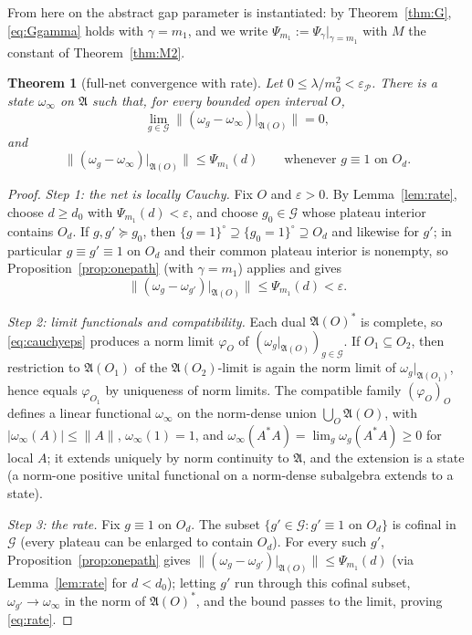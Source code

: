 \documentclass[11pt,a4paper]{article}
\theoremstyle{plain}
\newtheorem{theorem}{Theorem}[section]
\theoremstyle{definition}
\theoremstyle{plain}
\theoremstyle{definition}
\newcommand{\A}{\mathfrak{A}}
\newcommand{\G}{\mathcal{G}}
\begin{document}
From here on the abstract gap parameter is instantiated: by Theorem~\ref{thm:G},
\eqref{eq:Ggamma} holds with $\gamma=m_1$, and we write
$\Psi_{m_1}:=\Psi_\gamma|_{\gamma=m_1}$ with $M$ the constant of Theorem~\ref{thm:M2}.

\begin{theorem}[full-net convergence with rate]\label{thm:cauchy}
Let $0\le\lambda/m_0^2<\varepsilon_{\mathscr P}$. There is a state $\omega_\infty$ on $\A$
such that, for every bounded open interval $O$,
\[
 \lim_{g\in\G}\bigl\|(\omega_g-\omega_\infty)|_{\A(O)}\bigr\|=0 ,
\]
and
\begin{equation}
 \|(\omega_g-\omega_\infty)|_{\A(O)}\|\le\Psi_{m_1}(d)
 \qquad\text{whenever }g\equiv1\text{ on }O_d .
 \label{eq:rate}
\end{equation}
\end{theorem}

\begin{proof}
\emph{Step 1: the net is locally Cauchy.} Fix $O$ and $\varepsilon>0$. By
Lemma~\ref{lem:rate}, choose $d\ge d_0$ with $\Psi_{m_1}(d)<\varepsilon$, and choose
$g_0\in\G$ whose plateau interior contains $O_d$. If $g,g'\succcurlyeq g_0$, then
$\{g=1\}^\circ\supseteq\{g_0=1\}^\circ\supseteq O_d$ and likewise for $g'$; in particular
$g\equiv g'\equiv1$ on $O_d$ and their common plateau interior is nonempty, so
Proposition~\ref{prop:onepath} (with $\gamma=m_1$) applies and gives
\begin{equation}
 \|(\omega_g-\omega_{g'})|_{\A(O)}\|\le\Psi_{m_1}(d)<\varepsilon .
 \label{eq:cauchyeps}
\end{equation}

\emph{Step 2: limit functionals and compatibility.} Each dual $\A(O)^*$ is complete, so
\eqref{eq:cauchyeps} produces a norm limit $\varphi_O$ of $(\omega_g|_{\A(O)})_{g\in\G}$.
If $O_1\subseteq O_2$, then restriction to $\A(O_1)$ of the $\A(O_2)$-limit is again the
norm limit of $\omega_g|_{\A(O_1)}$, hence equals $\varphi_{O_1}$ by uniqueness of norm
limits. The compatible family $(\varphi_O)_O$ defines a linear functional $\omega_\infty$
on the norm-dense union $\bigcup_O\A(O)$, with $|\omega_\infty(A)|\le\|A\|$,
$\omega_\infty(1)=1$, and $\omega_\infty(A^*A)=\lim_g\omega_g(A^*A)\ge0$ for local $A$; it
extends uniquely by norm continuity to $\A$, and the extension is a state (a norm-one
positive unital functional on a norm-dense subalgebra extends to a state).

\emph{Step 3: the rate.} Fix $g\equiv1$ on $O_d$. The subset
$\{g'\in\G:g'\equiv1\text{ on }O_d\}$ is cofinal in $\G$ (every plateau can be enlarged to
contain $O_d$). For every such $g'$, Proposition~\ref{prop:onepath} gives
$\|(\omega_g-\omega_{g'})|_{\A(O)}\|\le\Psi_{m_1}(d)$ (via Lemma~\ref{lem:rate} for
$d<d_0$); letting $g'$ run through this cofinal subset, $\omega_{g'}\to\omega_\infty$ in
the norm of $\A(O)^*$, and the bound passes to the limit, proving \eqref{eq:rate}.
\end{proof}
\end{document}
